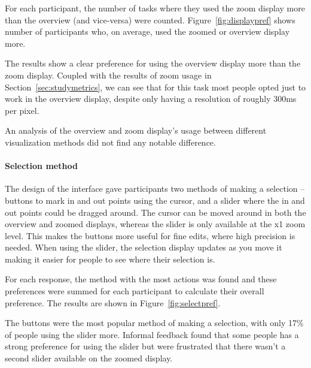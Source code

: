 For each participant, the number of tasks where they used the zoom display more than the overview (and vice-versa) were
counted. Figure~\ref{fig:displaypref} shows number of participants who, on average, used the zoomed or overview display
more.

The results show a clear preference for using the overview display more than the zoom display. Coupled with the results
of zoom usage in Section~\ref{sec:studymetrics}, we can see that for this task most people opted just to work in the
overview display, despite only having a resolution of roughly 300ms per pixel.

An analysis of the overview and zoom display's usage between different visualization methods did not find any notable
difference.

\paragraph{Selection method}
The design of the interface gave participants two methods of making a selection -- buttons to mark in and out points
using the cursor, and a slider where the in and out points could be dragged around. The cursor can be moved around in
both the overview and zoomed displays, whereas the slider is only available at the x1 zoom level. This makes the
buttons more useful for fine edits, where high precision is needed. When using the slider, the selection display
updates as you move it making it easier for people to see where their selection is.

For each response, the method with the most actions was found and these preferences were summed for each participant to
calculate their overall preference. The results are shown in Figure~\ref{fig:selectpref}.

The buttons were the most popular method of making a selection, with only 17\% of people using the slider more.
Informal feedback found that some people has a strong preference for using the slider but were frustrated that there
wasn't a second slider available on the zoomed display.

